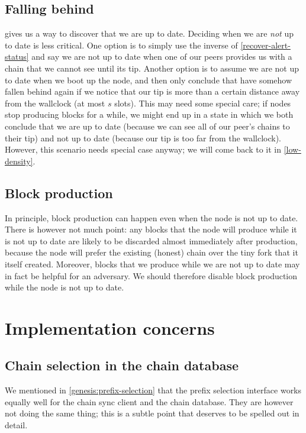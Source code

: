 \subsection{Falling behind}

 gives us a way to discover that we are up to date.
Deciding when we are \emph{not} up to date is less critical. One option is to
simply use the inverse of \cref{recover-alert-status} and say we are not up to
date when one of our peers provides us with a chain that we cannot see until its
tip.  Another option is to assume we are not up to date when we boot up the
node, and then only conclude that have somehow fallen behind again if we notice
that our tip is more than a certain distance away from the wallclock (at most
$s$ slots). This may need some special care; if nodes stop producing blocks for
a while, we might end up in a state in which we both conclude that we are up to
date (because we can see all of our peer's chains to their tip) and not up to
date (because our tip is too far from the wallclock). However, this scenario
needs special case anyway; we will come back to it in \cref{low-density}.

\subsection{Block production}
\label{sec:block-production-when-behind}

In principle, block production can happen even when the node is not up to date.
There is however not much point: any blocks that the node will produce while it
is not up to date are likely to be discarded almost immediately after
production, because the node will prefer the existing (honest) chain over the
tiny fork that it itself created. Moreover, blocks that we produce while we are
not up to date may in fact be helpful for an adversary. We should therefore
disable block production while the node is not up to date.

\section{Implementation concerns}

\subsection{Chain selection in the chain database}
\label{genesis:chain-database}

We mentioned in \cref{genesis:prefix-selection} that the prefix selection
interface works equally well for the chain sync client and the chain database.
They are however not doing the same thing; this is a subtle point that deserves
to be spelled out in detail.

